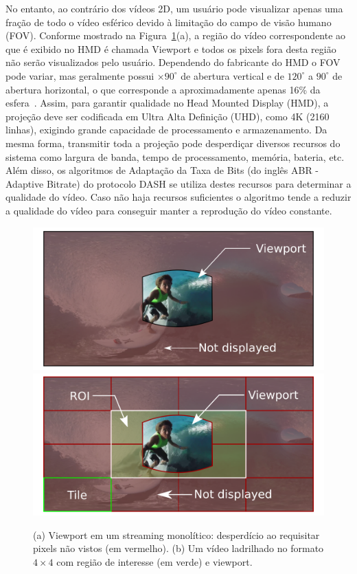 No entanto, ao contrário dos vídeos 2D, um usuário pode visualizar apenas uma fração de todo o vídeo esférico devido à limitação do campo de visão humano (FOV). Conforme mostrado na Figura~\ref{fig:viewport}(a), a região do vídeo correspondente ao que é exibido no HMD é chamada Viewport e todos os pixels fora desta região não serão visualizados pelo usuário. Dependendo do fabricante do HMD o FOV pode variar, mas geralmente possui $\times90^{\circ}$ de abertura vertical e de $120^{\circ}$ a $90^{\circ}$ de abertura horizontal, o que corresponde a aproximadamente apenas 16\% da esfera~\cite{Afzal2017}. Assim, para garantir qualidade no Head Mounted Display (HMD), a projeção deve ser codificada em Ultra Alta Definição (UHD), como 4K (2160 linhas), exigindo grande capacidade de processamento e armazenamento. Da mesma forma, transmitir toda a projeção pode desperdiçar diversos recursos do sistema como largura de banda, tempo de processamento, memória, bateria, etc. Além disso, os algoritmos de Adaptação da Taxa de Bits (do inglês ABR - Adaptive Bitrate) do protocolo DASH se utiliza destes recursos para determinar a qualidade do vídeo. Caso não haja recursos suficientes o algoritmo tende a reduzir a qualidade do vídeo para conseguir manter a reprodução do vídeo constante.


\begin{figure}[htb]
        \centering
        \includegraphics[width=0.49\columnwidth]{fig/viewport1.png} \hfill
        \includegraphics[width=0.49\columnwidth]{fig/viewport2.png} \\
        \caption{(a) Viewport em um streaming monolítico: desperdício ao requisitar pixels não vistos (em vermelho). (b) Um vídeo ladrilhado no formato $4 \times 4$ com região de interesse (em verde) e viewport.}
        \label{fig:viewport}
\end{figure}

